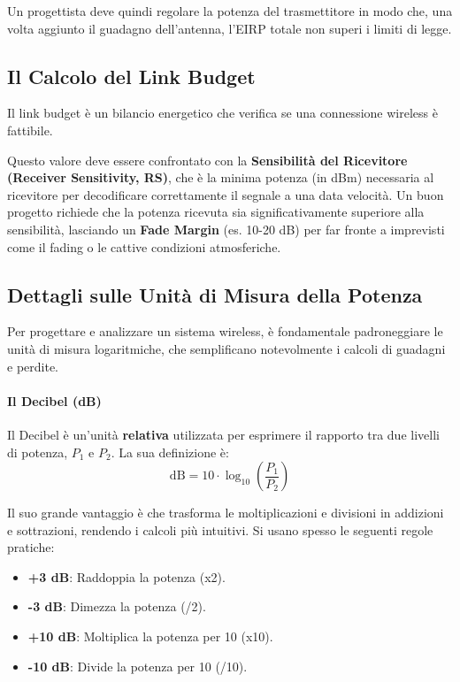 Un progettista deve quindi regolare la potenza del trasmettitore in modo che, una volta aggiunto il guadagno dell'antenna, l'EIRP totale non superi i limiti di legge.

\subsection{Il Calcolo del Link Budget}
Il link budget è un bilancio energetico che verifica se una connessione wireless è fattibile.


Questo valore deve essere confrontato con la \textbf{Sensibilità del Ricevitore (Receiver Sensitivity, RS)}, che è la minima potenza (in dBm) necessaria al ricevitore per decodificare correttamente il segnale a una data velocità. Un buon progetto richiede che la potenza ricevuta sia significativamente superiore alla sensibilità, lasciando un \textbf{Fade Margin} (es. 10-20 dB) per far fronte a imprevisti come il fading o le cattive condizioni atmosferiche.
\subsection{Dettagli sulle Unità di Misura della Potenza}
Per progettare e analizzare un sistema wireless, è fondamentale padroneggiare le unità di misura logaritmiche, che semplificano notevolmente i calcoli di guadagni e perdite.

\paragraph{Il Decibel (dB)}
Il Decibel è un'unità \textbf{relativa} utilizzata per esprimere il rapporto tra due livelli di potenza, $P_1$ e $P_2$. La sua definizione è:
$$ \text{dB} = 10 \cdot \log_{10}\left(\frac{P_1}{P_2}\right) $$

Il suo grande vantaggio è che trasforma le moltiplicazioni e divisioni in addizioni e sottrazioni, rendendo i calcoli più intuitivi. Si usano spesso le seguenti regole pratiche:
\begin{itemize}
    \item \textbf{+3 dB}: Raddoppia la potenza (x2).
    \item \textbf{-3 dB}: Dimezza la potenza (/2).
    \item \textbf{+10 dB}: Moltiplica la potenza per 10 (x10).
    \item \textbf{-10 dB}: Divide la potenza per 10 (/10).
\end{itemize}

